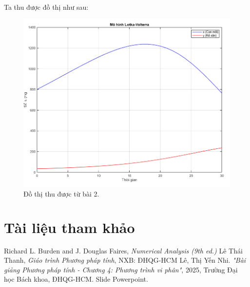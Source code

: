 \documentclass[a4paper,15pt]{article}
\begin{document}
Ta thu được đồ thị như sau:
\begin{figure}[H]
    \centering
    \includegraphics[scale=0.5]{img/Dothibai2.png}
    \caption{Đồ thị thu được từ bài 2.}
    \label{fig:enter-label}
\end{figure}
\section{Tài liệu tham khảo}
\begin{thebibliography}{9}
Richard L. Burden and J. Douglas Faires,
\textit{Numerical Analysis (9th ed.)}
Lê Thái Thanh,
\textit{Giáo trình Phương pháp tính},
 NXB: ĐHQG-HCM 
Lê, Thị Yến Nhi.
\textit{"Bài giảng Phương pháp tính - Chương 4: Phương trình vi phân"}, 2025, Trường Đại học Bách khoa, ĐHQG-HCM. Slide Powerpoint.
\end{thebibliography}
\end{document}
